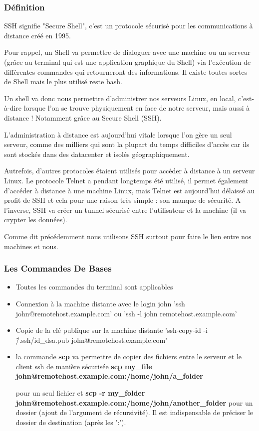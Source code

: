 \subsubsection{Définition}

SSH signifie "Secure Shell", c'est un protocole sécurisé pour les communications
 à distance créé en 1995.\newline

Pour rappel, un Shell va permettre de dialoguer avec une machine ou un serveur
(grâce au terminal qui est une application graphique du Shell) via l'exécution
de différentes commandes qui retourneront des informations. Il existe toutes
sortes de Shell mais le plus utilisé reste bash.


Un shell va donc nous permettre d'administrer nos serveurs Linux, en local,
c'est-à-dire lorsque l'on se trouve physiquement en face de notre serveur, mais
aussi à distance ! Notamment grâce au Secure Shell (SSH).\newline

L'administration à distance est aujourd'hui vitale lorsque l'on gère un seul
serveur, comme des milliers qui sont la plupart du temps difficiles d'accès car
ils sont stockés dans des datacenter et isolés géographiquement.

Autrefois, d'autres protocoles étaient utilisés pour accéder à distance à un
serveur Linux. Le protocole Telnet a pendant longtemps été utilisé, il permet
également d'accéder à distance à une machine Linux, mais Telnet est aujourd'hui
délaissé au profit de SSH et cela pour une raison très simple : son manque de
sécurité. A l'inverse, SSH va créer un tunnel sécurisé entre l'utilisateur et la
machine (il va crypter les données).

Comme dit précédemment nous utilisons SSH surtout pour faire le lien entre nos
machines et nous.

\subsubsection{Les Commandes De Bases}
\begin{itemize}
	\item Toutes les commandes du terminal sont applicables
	\item Connexion à la machine distante avec le login john 'ssh john@remotehost.example.com' ou 'ssh -l john remotehost.example.com'
	\item Copie de la clé publique sur la machine distante
  'ssh-copy-id -i \~/.ssh/id\_dsa.pub john@remotehost.example.com'
	\item la commande \textbf{scp} va permettre de copier des fichiers entre le
  serveur et le client ssh de manière sécurisée \textbf{scp my\_file
  john@remotehost.example.com:/home/john/a\_folder}


	pour un seul fichier et \textbf{scp -r my\_folder
  john@remotehost.example.com:/home/john/another\_folder} pour un dossier
	(ajout de l’argument de récursivité). Il est indispensable de préciser le
  dossier de destination (après les ':').
\end{itemize}
